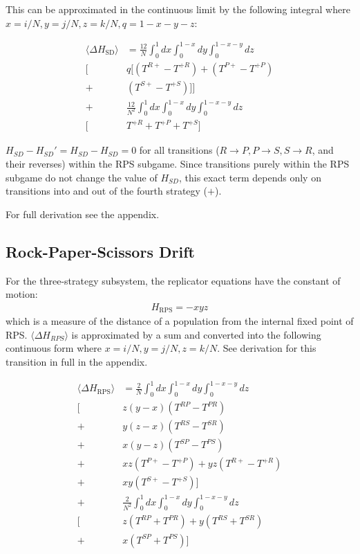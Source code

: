 \documentclass[%
 reprint,
 amsmath,amssymb,
 aps,
]{revtex4-2}
\begin{document}
This can be approximated in the continuous limit by the following integral where $x = i/N, y=j/N, z=k/N, q = 1-x-y-z$:

\begin{align}\label{eq:delta_h_sd}
\langle \Delta H_{\mathrm{SD}} \rangle 
&= \frac{12}{N} \int_{0}^{1} dx \int_{0}^{1-x}dy 
\int_{0}^{1-x-y}dz \\ \nonumber
\Big[& q \big[ 
(T^{R+} - T^{+R}) + (T^{P+} - T^{+P}) \\\nonumber
+& (T^{S+} - T^{+S}) \big] \Big] \\\nonumber
+& \frac{12}{N^2} \int_{0}^{1} dx \int_{0}^{1-x}dy 
\int_{0}^{1-x-y} dz \\ \nonumber
\Big[& T^{+R} + T^{+P} + T^{+S} \Big] 
\end{align}


$H_{SD} - H_{SD}' = H_{SD} - H_{SD} = 0$ for all transitions
($R \rightarrow P, P \rightarrow S, S \rightarrow R$,
and their reverses) within the RPS subgame. 
Since transitions purely within the RPS subgame do not change the value
of $H_{SD}$, this exact term depends only on transitions into and out of 
the fourth strategy ($+$). 

For full
derivation see the appendix\cite{project_appendix}.



\subsection{Rock-Paper-Scissors Drift}
For the three-strategy subsystem, the replicator equations have the constant of motion:
\begin{align}
H_{\mathrm{RPS}} = - x y z
\end{align}
which is a measure of the distance of a population from the internal fixed point of RPS.
$\langle \Delta H_{RPS} \rangle$ is approximated by a sum and converted into the following continuous form where
$x = i/N, y= j/N, z=k/N$. See derivation for this transition in full 
in the appendix.

\begin{align}
\langle \Delta H_{\mathrm{RPS}} \rangle
&= \frac{2}{N} \int_{0}^{1}dx 
\int_{0}^{1-x}dy
\int_{0}^{1-x-y}dz \nonumber\\
\Big[ 
&z (y-x) (T^{RP} - T^{PR}) \nonumber\\
+& y (z-x) (T^{RS} - T^{SR}) \nonumber\\
+& x (y-z) (T^{SP} - T^{PS}) \nonumber\\
+& xz(T^{P+} - T^{+P}) + yz(T^{R+} - T^{+R}) \nonumber\\
+& xy(T^{S+} - T^{+S})
\Big] \nonumber\\
+& \frac{2}{N^2} \int_{0}^{1}dx \int_{0}^{1-x}dy
\int_{0}^{1-x-y}dz \nonumber\\
\Big[
&z(T^{RP} + T^{PR}) + y(T^{RS} + T^{SR}) \nonumber\\
+& x(T^{SP} + T^{PS})
\Big]
\end{align}
\end{document}
